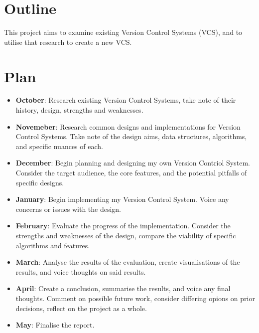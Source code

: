 \documentclass[a4paper,12pt]{article}
\title{}
\author{Reece Donovan}
\begin{document}
\pagestyle{empty}
\section*{Outline}
This project aims to examine existing Version Control Systems (VCS), and to utilise that research to create a new VCS\@.
\section*{Plan}
\begin{itemize}
    \item \textbf{October}: Research existing Version Control Systems, take note of their history, design, strengths and weaknesses.
    \item \textbf{Novemeber}: Research common designs and implementations for Version Control Systems. Take note of the design aims, data structures, algorithms, and specific nuances of each.
    \item \textbf{December}: Begin planning and designing my own Version Contriol System. Consider the target audience, the core features, and the potential pitfalls of specific designs.
    \item \textbf{January}: Begin implementing my Version Control System. Voice any concerns or issues with the design.
    \item \textbf{February}: Evaluate the progress of the implementation. Consider the strengths and weaknesses of the design, compare the viability of specific algorithms and features.
    \item \textbf{March}: Analyse the results of the evaluation, create visualisations of the results, and voice thoughts on said results.
    \item \textbf{April}: Create a conclusion, summarise the results, and voice any final thoughts. Comment on possible future work, consider differing opions on prior decisions, reflect on the project as a whole.
    \item \textbf{May}: Finalise the report.
\end{itemize}
\end{document}
